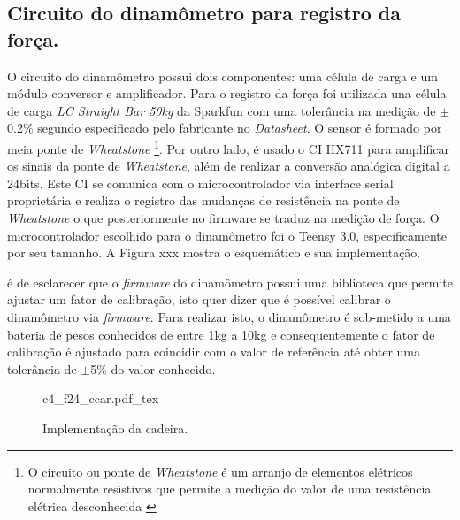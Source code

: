 \subsection*{Circuito do dinamômetro para registro da força.}

O circuito do dinamômetro possui dois componentes: uma célula de carga e um módulo conversor e amplificador. Para o registro da força foi utilizada una célula de carga \textit{LC Straight Bar 50kg} da Sparkfun com uma tolerância na medição de $\mathrm{\pm}$0.2\% segundo especificado pelo fabricante no \textit{Datasheet}. O sensor é formado por meia ponte de \textit{Wheatstone} \footnote{O circuito ou ponte de \textit{Wheatstone} é um arranjo de elementos elétricos normalmente resistivos que permite a medição do valor de uma resistência elétrica desconhecida \cite{Boylestad2013DispositivosCircuitos}}. Por outro lado, é usado o \acrshort{CI} HX711 para amplificar os sinais da ponte de \textit{Wheatstone}, além de realizar a conversão analógica digital a 24bits. Este \acrshort{CI} se comunica com o microcontrolador via interface serial proprietária e realiza o registro das mudanças de resistência na ponte de \textit{Wheatstone} o que posteriormente no firmware se traduz na medição de força. O microcontrolador escolhido para o dinamômetro foi o Teensy 3.0, especificamente por seu tamanho. A Figura xxx mostra o esquemático e sua implementação.

é de esclarecer que o \textit{firmware} do dinamômetro possui uma biblioteca que permite ajustar um fator de calibração, isto quer dizer que é possível calibrar o dinamômetro via \textit{firmware}. Para realizar isto, o dinamômetro é sob-metido a uma bateria de pesos conhecidos de entre 1kg a 10kg e consequentemente o fator de calibração é ajustado para coincidir com o valor de referência até obter uma tolerância de $\mathrm{\pm}$5\% do valor conhecido.

\begin{figure}
    \centering %
    \small %
    \def\svgwidth{0.9\columnwidth}%
    {c4_f24_ccar.pdf_tex}
    \caption{Implementação da cadeira.}
    \label{fig:c4_f25_dct}
\end{figure}







